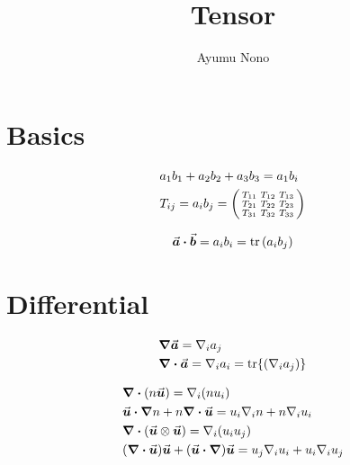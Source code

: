 \documentclass[dvipdfmx,autodetect-engine]{article}
\title{Tensor}
\author{Ayumu Nono}
\begin{document}
\maketitle


\section{Basics}

\begin{align}
    &a_1 b_1 + a_2 b_2 + a_3 b_3 = a_1 b_i \\
    &T_{i j} = a_i b_j = \smqty(\xmat*{T}{3}{3}) 
\end{align}


\begin{align}
    &\va*{a} \vdot \va*{b} =  a_i b_i  = \tr \pqty{a_i b_j} \\
\end{align}

\section{Differential}

\begin{align}
    &\grad \va*{a} = \nabla_i a_j \\
    &\div \va*{a} = \nabla_i a_i = \tr{\pqty{ \nabla_i a_j }}
\end{align}

\begin{align}
    &\div \pqty{n \va*{u}} = \nabla_i \pqty{n u_i} \\
    &\va*{u} \vdot \grad n + n \div \va*{u} = u_i \nabla_i n + n \nabla_i u_i \\
    &\div \pqty{\va*{u} \otimes \va*{u}} = \nabla_i \pqty{u_i u_j} \\
    &\pqty{\div \va*{u}} \va*{u} + \pqty{\va*{u} \vdot \grad} \va*{u} = u_j \nabla_i u_i + u_i \nabla_i u_j\\
\end{align}
\end{document}
